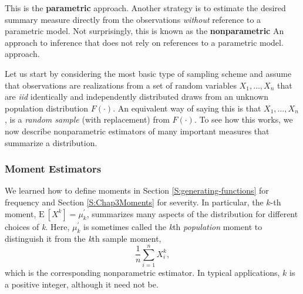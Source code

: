 \documentclass[]{book}
\theoremstyle{definition}
\theoremstyle{definition}
\theoremstyle{definition}
\theoremstyle{remark}
\begin{document}
This is the \textbf{parametric} approach. Another strategy is to
estimate the desired summary measure directly from the observations
\emph{without} reference to a parametric model. Not surprisingly, this
is known as the \textbf{nonparametric}{ An approach to inference that
does not rely on references to a parametric model.} approach.

Let us start by considering the most basic type of sampling scheme and
assume that observations are realizations from a set of random variables
\(X_1, \ldots, X_n\) that are \emph{iid}{ identically and independently
distributed} draws from an unknown population distribution \(F(\cdot)\).
An equivalent way of saying this is that \(X_1, \ldots, X_n\), is a
\emph{random sample} (with replacement) from \(F(\cdot)\). To see how
this works, we now describe nonparametric estimators of many important
measures that summarize a distribution.

\subsubsection{Moment Estimators}\label{S:MS:MomentEstimator}

We learned how to define moments in Section \ref{S:generating-functions}
for frequency and Section \ref{S:Chap3Moments} for severity. In
particular, the \(k\)-th moment, \(\mathrm{E~}[X^k] = \mu^{\prime}_k\),
summarizes many aspects of the distribution for different choices of
\emph{k}. Here, \(\mu^{\prime}_k\) is sometimes called the \emph{k}th
\emph{population} moment to distinguish it from the \emph{k}th sample
moment, \[
\frac{1}{n} \sum_{i=1}^n X_i^k ,
\] which is the corresponding nonparametric estimator. In typical
applications, \(k\) is a positive integer, although it need not be.
\end{document}
